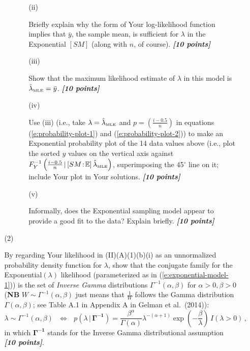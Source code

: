 \documentclass[12pt]{article}
\newcommand{\given}{\, | \,}
\newcommand{\bi}[1]{\b{\i{#1}}}
\renewcommand{\b}[1]{\textbf{#1}}
\renewcommand{\i}[1]{\textit{#1}}
\begin{document}
\begin{itemize}
\begin{itemize}
\begin{itemize}
\begin{itemize}
\item[(ii)]

Briefly explain why the form of Your log-likelihood function implies that $\bar{ y }$, the sample mean, is sufficient for $\lambda$ in the Exponential $[ SM ]$ (along with $n$, of course). \bi{[10 points]}

\item[(iii)]

Show that the maximum likelihood estimate of $\lambda$ in this model is $\hat{ \lambda }_{\mbox{\tiny MLE}} = \bar{ y }$. \bi{[10 points]}

\item[(iv)]

Use (iii) (i.e., take $\lambda = \hat{ \lambda }_{\mbox{\tiny MLE}}$ and $p = \left( \frac{ i - 0.5 }{ n } \right)$ in equations (\ref{e:probability-plot-1}) and (\ref{e:probability-plot-2})) to make an Exponential probability plot of the 14 data values above (i.e., plot the sorted $y$ values on the vertical axis against $F_Y^{ -1 } \left( \frac{ i - 0.5 }{ n } \given [ SM \! : \! \mathbb{ E } ] \,  \hat{ \lambda }_{\mbox{\tiny MLE}} \right)$, superimposing the 45$^\circ$ line on it; include Your plot in Your solutions. \bi{[10 points]}

\item[(v)]

Informally, does the Exponential sampling model appear to provide a good fit to the data? Explain briefly. \bi{[10 points]} 

\end{itemize}

\end{itemize}

\item[(2)]

By regarding Your likelihood in (II)(A)(1)(b)(i) as an unnormalized probability density function for $\lambda$, show that the conjugate family for the Exponential$( \lambda )$ likelihood (parameterized as in (\ref{e:exponential-model-1})) is the set of \textit{Inverse Gamma} distributions $\Gamma^{ -1 } ( \alpha, \beta )$ for $\alpha > 0, \beta > 0$ (\textbf{NB} $W \sim \Gamma^{ -1 } ( \alpha, \beta )$ just means that $\frac{ 1 }{ W }$ follows the Gamma distribution $\Gamma ( \alpha, \beta )$; see Table A.1 in Appendix A in Gelman et al.~(2014)):
\begin{equation} \label{e:inverse-gamma-1}
\lambda \sim \Gamma^{ -1 } ( \alpha, \beta ) \ \ \ \iff \ \ \ p ( \lambda \given \bm{ \Gamma^{ -1 } } ) = \frac{ \beta^\alpha }{ \Gamma ( \alpha ) }
\lambda^{ - ( \alpha + 1 ) } \exp \left( - \frac{ \beta }{ \lambda } \right) \, I ( \lambda > 0 ) \, ,
\end{equation}
in which $\bm{ \Gamma^{ -1 } }$ stands for the Inverse Gamma distributional assumption \bi{[10 points]}.


\end{itemize}
\end{itemize}
\end{document}
